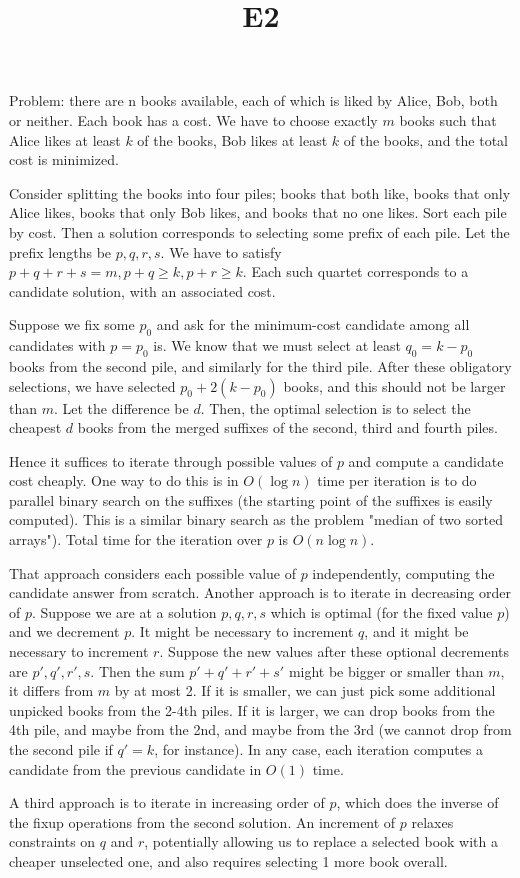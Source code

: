 \documentclass{article}
\title{E2}
\date{}
\begin{document}
\maketitle

Problem: there are n books available, each of which is liked by Alice, Bob, both or neither. Each book has a cost. We have to choose exactly $m$ books such that Alice likes at least $k$ of the books, Bob likes at least $k$ of the books, and the total cost is minimized.

Consider splitting the books into four piles; books that both like, books that only Alice likes, books that only Bob likes, and books that no one likes. Sort each pile by cost. Then a solution corresponds to selecting some prefix of each pile. Let the prefix lengths be $p, q, r, s$. We have to satisfy $p+q+r+s = m, p + q \ge k, p + r \ge k$. Each such quartet corresponds to a candidate solution, with an associated cost.

Suppose we fix some $p_0$ and ask for the minimum-cost candidate among all candidates with $p = p_0$ is. We know that we must select at least $q_0 = k - p_0$ books from the second pile, and similarly for the third pile. After these obligatory selections, we have selected $p_0 + 2(k-p_0)$ books, and this should not be larger than $m$. Let the difference be $d$. Then, the optimal selection is to select the cheapest $d$ books from the merged suffixes of the second, third and fourth piles.

Hence it suffices to iterate through possible values of $p$ and compute a candidate cost cheaply. One way to do this is in $O(\log n)$ time per iteration is to do parallel binary search on the suffixes (the starting point of the suffixes is easily computed). This is a similar binary search as the problem "median of two sorted arrays"). Total time for the iteration over $p$ is $O(n \log n)$.

That approach considers each possible value of $p$ independently, computing the candidate answer from scratch. Another approach is to iterate in decreasing order of $p$. Suppose we are at a solution $p, q, r, s$ which is optimal (for the fixed value $p$) and we decrement $p$. It might be necessary to increment $q$, and it might be necessary to increment $r$. Suppose the new values after these optional decrements are $p', q', r', s$. Then the sum $p' + q' + r' + s'$ might be bigger or smaller than $m$, it differs from $m$ by at most 2. If it is smaller, we can just pick some additional unpicked books from the 2-4th piles. If it is larger, we can drop books from the 4th pile, and maybe from the 2nd, and maybe from the 3rd (we cannot drop from the second pile if $q' = k$, for instance). In any case, each iteration computes a candidate from the previous candidate in $O(1)$ time.

A third approach is to iterate in increasing order of $p$, which does the inverse of the fixup operations from the second solution. An increment of $p$ relaxes constraints on $q$ and $r$, potentially allowing us to replace a selected book with a cheaper unselected one, and also requires selecting 1 more book overall.
\end{document}
